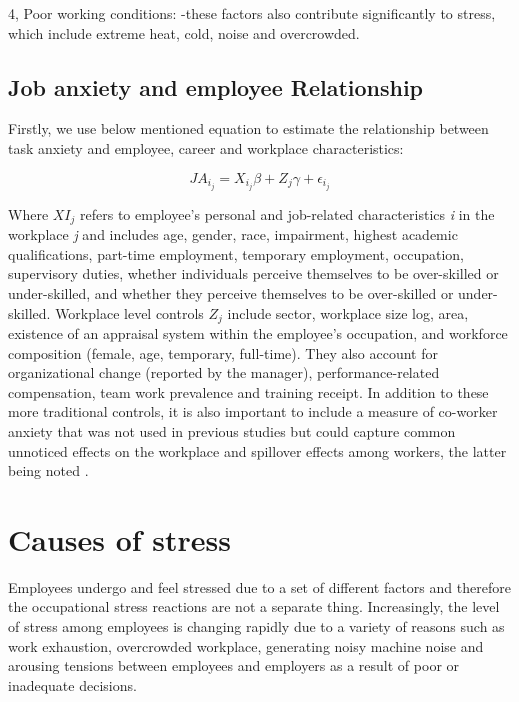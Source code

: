 4, Poor working conditions: -these factors also contribute significantly to stress, which include extreme heat, cold, noise and overcrowded. \citep[p.318-319]{Bloisi2007ManagementBehaviour}

\subsection{Job anxiety and employee Relationship}

Firstly, we use below mentioned equation to estimate the relationship between task anxiety and employee, career and workplace characteristics:

\[JA_{i_j} = X_{i_j} \beta+Z_j \gamma+\epsilon_{i_j}\]

Where \(X { I_j}\) refers to employee's personal and job-related characteristics \textit{i } in the workplace \textit{j } and includes age, gender, race, impairment, highest academic qualifications, part-time employment, temporary employment, occupation, supervisory duties, whether individuals perceive themselves to be over-skilled or under-skilled, and whether they perceive themselves to be over-skilled or under-skilled. Workplace level controls \(Z_j\) include sector, workplace size log, area, existence of an appraisal system within the employee's occupation, and workforce composition (female, age, temporary, full-time). They also account for organizational change (reported by the manager), performance-related compensation, team work prevalence and training receipt.  In addition to these more traditional controls, it is also important to include a measure of co-worker anxiety that was not used in previous studies but could capture common unnoticed effects on the workplace and spillover effects among workers, the latter being noted \citep{Cottini2013MentalEurope}.

\section{Causes of stress}
Employees undergo and feel stressed due to a set of different factors and therefore the occupational stress reactions are not a separate thing. \citep[p.8]{Fairbrother2003WorkplaceSatisfaction} Increasingly, the level of stress among employees is changing rapidly due to a variety of reasons such as work exhaustion, overcrowded workplace, generating noisy machine noise and arousing tensions between employees and employers as a result of poor or inadequate decisions.

